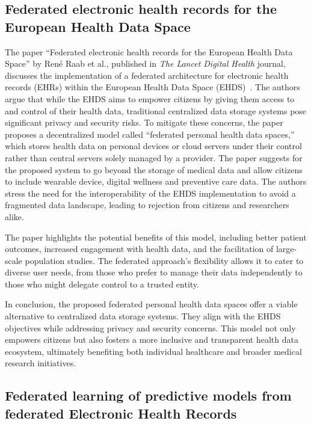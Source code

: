 \subsection{Federated electronic health records for the European Health Data Space}\label{subsec:federated-electronic-health-records-for-the-european-health-data-space}

The paper ``Federated electronic health records for the European Health Data Space'' by René Raab et al., published in \textit{The Lancet Digital Health} journal, discusses the implementation of a federated architecture for electronic health records (EHRs) within the European Health Data Space (EHDS)~\cite{raab_federated_2023}.
The authors argue that while the EHDS aims to empower citizens by giving them access to and control of their health data, traditional centralized data storage systems pose significant privacy and security risks.
To mitigate these concerns, the paper proposes a decentralized model called ``federated personal health data spaces,'' which stores health data on personal devices or cloud servers under their control rather than central servers solely managed by a provider.
The paper suggests for the proposed system to go beyond the storage of medical data and allow citizens to include wearable device, digital wellness and preventive care data.
The authors stress the need for the interoperability of the EHDS implementation to avoid a fragmented data landscape, leading to rejection from citizens and researchers alike.

The paper highlights the potential benefits of this model, including better patient outcomes, increased engagement with health data, and the facilitation of large-scale population studies.
The federated approach's flexibility allows it to cater to diverse user needs, from those who prefer to manage their data independently to those who might delegate control to a trusted entity.

In conclusion, the proposed federated personal health data spaces offer a viable alternative to centralized data storage systems.
They align with the EHDS objectives while addressing privacy and security concerns.
This model not only empowers citizens but also fosters a more inclusive and transparent health data ecosystem, ultimately benefiting both individual healthcare and broader medical research initiatives.

\subsection[Federated learning on Electronic Health Records]{Federated learning of predictive models from federated Electronic Health Records}\label{subsec:federated-learning-of-predictive-models-from-federated-electronic-health-records}

